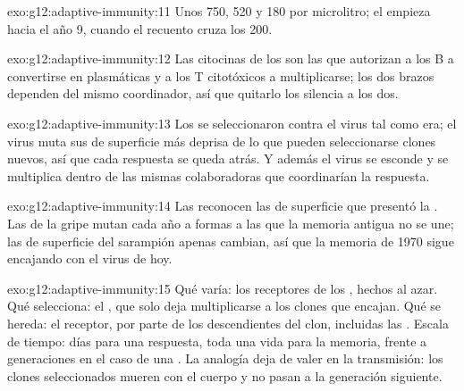 \begin{solution}{exo:g12:adaptive-immunity:11}
Unos 750, 520 y 180 por microlitro; el  empieza hacia el año 9,
cuando el recuento cruza los 200.
\end{solution}

\begin{solution}{exo:g12:adaptive-immunity:12}
Las citocinas de los  son las que autorizan a
los  B a convertirse en  plasmáticas y a los T
citotóxicos a multiplicarse; los dos brazos dependen del mismo
coordinador, así que quitarlo los silencia a los dos.
\end{solution}

\begin{solution}{exo:g12:adaptive-immunity:13}
Los  se seleccionaron contra el virus tal como era; el virus
muta sus  de superficie más deprisa de lo que pueden
seleccionarse clones nuevos, así que cada respuesta se queda atrás. Y
además el virus se esconde y se multiplica dentro de las mismas 
colaboradoras que coordinarían la respuesta.
\end{solution}

\begin{solution}{exo:g12:adaptive-immunity:14}
Las  reconocen las  de superficie que
presentó la . Las de la gripe mutan cada año a formas a las que
la memoria antigua no se une; las  de superficie del sarampión
apenas cambian, así que la memoria de 1970 sigue encajando con el virus
de hoy.
\end{solution}

\begin{solution}{exo:g12:adaptive-immunity:15}
Qué varía: los receptores de los , hechos al azar. Qué
selecciona: el , que solo deja multiplicarse a los clones que
encajan. Qué se hereda: el receptor, por parte de los descendientes del
clon, incluidas las . Escala de tiempo: días para una
respuesta, toda una vida para la memoria, frente a generaciones en el
caso de una . La analogía deja de valer en la transmisión: los
clones seleccionados mueren con el cuerpo y no pasan a la generación
siguiente.
\end{solution}

